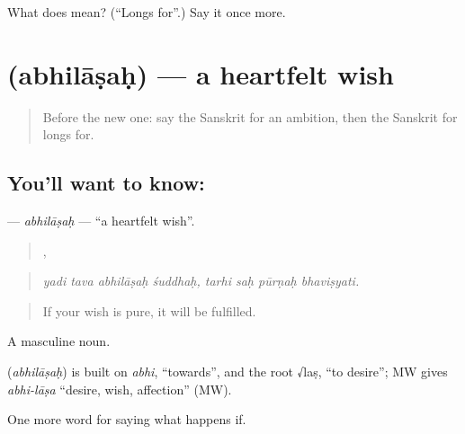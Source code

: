 \begin{tcolorbox}[breakable,colback=teal!4,colframe=teal!35!black,title={Before you move on}]
What does  mean? (\textquotedblleft{}Longs for\textquotedblright{}.) Say it once more.
\end{tcolorbox}
\section[\texorpdfstring{\sk{अभिलाषः} (abhilāṣaḥ)}{अभिलाषः (abhilāṣaḥ)}]{ (abhilāṣaḥ) — a heartfelt wish}

\label{lesson:SA-C383-abhilasah}



\begin{quote}
Before the new one: say the Sanskrit for an ambition, then the Sanskrit for longs for.
\end{quote}

\subsection*{You'll want to know: }
\textbf{} — \emph{abhilāṣaḥ} — \textquotedblleft{}a heartfelt wish\textquotedblright{}.

\begin{quote}
   ,    
\end{quote}

\begin{quote}
\emph{yadi tava abhilāṣaḥ śuddhaḥ, tarhi saḥ pūrṇaḥ bhaviṣyati.}
\end{quote}

\begin{quote}
If your wish is pure, it will be fulfilled.
\end{quote}

A masculine noun.

\begin{cousinweb}
\textbf{} (\emph{abhilāṣaḥ}) is built on \emph{abhi}, \textquotedblleft{}towards\textquotedblright{}, and the root √laṣ, \textquotedblleft{}to desire\textquotedblright{}; MW gives \emph{abhi-lāṣa} \textquotedblleft{}desire, wish, affection\textquotedblright{} (MW).
\end{cousinweb}

\begin{grammarlens}[title={What you've built}]
One more word for saying what happens if.
\end{grammarlens}

